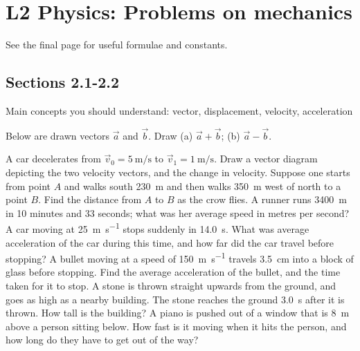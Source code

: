 \documentclass[a4paper]{exam}
\begin{document}
  \section*{L2 Physics: Problems on mechanics}
  See the final page for useful formulae and constants.
  \subsection*{Sections 2.1-2.2}
  Main concepts you should understand: vector, displacement, velocity, acceleration
  \begin{questions}
    \question Below are drawn vectors $ \vec{a} $ and $ \vec{b} $. Draw (a) $ \vec{a} + \vec{b} $; (b) $ \vec{a} - \vec{b} $.

    \question A car decelerates from $ \vec{v}_0 = \SI{5}{\metre\per\second} $ to $ \vec{v}_1 = \SI{1}{\metre\per\second} $.
              Draw a vector diagram depicting the two velocity vectors, and the change in velocity.
    \question Suppose one starts from point $ A $ and walks south \SI{230}{\metre} and then walks \SI{350}{\metre}
              west of north to a point $ B $. Find the distance from $ A $ to $ B $ as the crow flies.
    \question A runner runs \SI{3400}{\metre} in 10 minutes and 33 seconds; what was her average speed in metres per second?
    \question A car moving at \SI{25}{\metre\per\second} stops suddenly in \SI{14.0}{\second}. What was average acceleration
              of the car during this time, and how far did the car travel before stopping?
    \question A bullet moving at a speed of \SI{150}{\metre\per\second} travels \SI{3.5}{\centi\metre} into a block of glass
              before stopping. Find the average acceleration of the bullet, and the time taken for it to stop.
    \question A stone is thrown straight upwards from the ground, and goes as high as a nearby building. The stone
              reaches the ground \SI{3.0}{\second} after it is thrown. How tall is the building?
    \question A piano is pushed out of a window that is \SI{8}{\metre} above a person sitting below. How
              fast is it moving when it hits the person, and how long do they have to get out of the way?

\end{questions}
\end{document}
